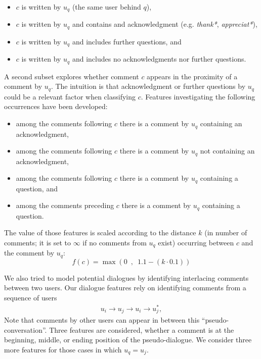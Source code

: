 \begin{itemize}
\item $c$ is written by $u_q$ (\ie the same user behind $q$),
\item \label{enu:context_ack} 
  $c$ is written by $u_q$ and contains and acknowledgment (e.g.   
  \textit{thank*}, \textit{appreciat*}),
\item \label{enu:context_quest}
  $c$ is written by $u_q$ and includes further questions, and 
\item $c$ is written by $u_q$ and includes no acknowledgments nor further 
questions.
\end{itemize}
% 
A second subset explores whether comment $c$ appears in the proximity of a 
comment by $u_q$. The intuition is that acknowledgment or further questions by 
$u_q$ could be a relevant factor when classifying $c$. Features investigating 
the following occurrences have been developed:

\begin{itemize}
\item among the comments following $c$ there is a comment by $u_q$ containing 
an acknowledgment,
\item among the comments following $c$ there is a comment by $u_q$ not 
containing an acknowledgment,
\item among the comments following $c$ there is a comment by $u_q$ containing a 
question, and
\item among the comments preceding $c$ there is a comment by $u_q$ containing a 
question.
\end{itemize}

The value of those features is scaled according to the distance $k$ (in number 
of comments; it is set to $\infty$ if no comments from $u_q$ exist) occurring 
between $c$ and the comment by $u_q$:
% 
\begin{equation}
 f(c)=\max \left(0\enspace,\enspace 1.1-(k \cdot 0.1) \right)
\end{equation}
%

We also tried to model potential dialogues by identifying interlacing comments 
between two users. Our dialogue features rely on identifying comments from
a sequence of users 
\begin{align*}
u_i \rightarrow u_j \rightarrow u_i \rightarrow u_j^*,
\end{align*}
% 
Note that comments by other 
users can appear in between this ``pseudo-conversation''. Three features are 
considered, whether a comment is at the beginning, middle, or ending position of 
the pseudo-dialogue. We consider three more features for those cases in which 
$u_q=u_j$. 

